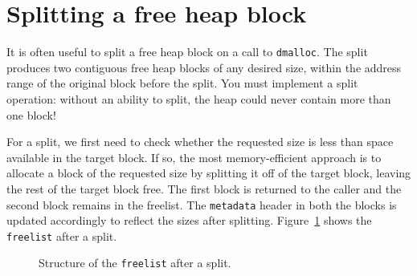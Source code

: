 \documentclass[a4paper,10pt]{article}
\newcommand{\comment}[1]{}
\begin{document}
\comment{
Figure~\ref{fig:freelist} shows an allocated block along with its metadata
information (the blue region). The payload denotes the space allocated to the user.

There are two possible choices during  initialization. You can append
prologue and epilogue blocks to the start and the end of the
\texttt{freelist}, or initialize the \texttt{freelist} pointers to
\texttt{NULL}. 

We provide the code for the latter; however using the former
may help you to tackle the corner cases more succinctly.

\begin{lstlisting}
        size_t max_bytes = ALIGN(MAX_HEAP_SIZE);
        freelist = (metadata_t*) sbrk(max_bytes);
        /* Why casting is needed here? i.e., why (void*)-1? */
        if (freelist == (void *)-1)
                return false;
        freelist->next = NULL;
        freelist->prev = NULL;
        freelist->size = max_bytes-METADATA_T_ALIGNED;
\end{lstlisting}
}

\section{Splitting a free heap block}

It is often useful to split a free heap block on a call to 
\texttt{dmalloc}.   The split produces two contiguous free heap blocks of any
desired size, within the address range of the original block before the split.
You must implement a split operation: without an ability to split, the heap
could never contain more than one block!

For a split, we first need to check whether the requested size is
less than space available in the target block.  If so, the most memory-efficient approach is
to allocate a block of the requested size by splitting
it off of the target block, leaving the rest of the target block free.
The first block is returned to the caller and the second
block remains in the freelist.
The
\texttt{metadata} header in both the blocks is updated accordingly to reflect the
sizes after splitting.
Figure~\ref{fig:split} shows the \texttt{freelist} after a split.

\begin{figure}[!ht]
\centering
{}\hspace{2mm}\hspace{1mm}
\caption{Structure of the \texttt{freelist} after a split.}
\label{fig:split}
\end{figure}
\end{document}
